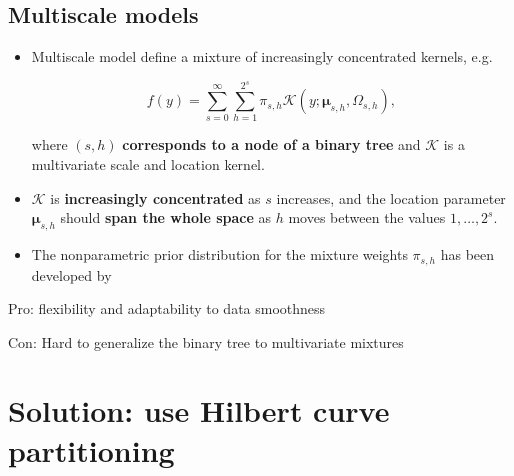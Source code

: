 \documentclass[a0,portrait]{a0poster}
\begin{document}
\begin{multicols}{2}
\subsection*{Multiscale models}
\color{Black}

\begin{itemize}
    \item[] Multiscale model define a mixture of increasingly concentrated kernels, e.g.

        \[
            f(y) = \sum_{s=0}^{\infty }\sum_{h=1}^{2^{s}} \pi_{s,h} \mathcal{K}(y; \bm{\mu}_{s,h}, \Omega_{s,h}),
        \]

        where $(s,h)$ \textbf{corresponds to a node of a binary tree} and $ \mathcal{K}$ is a multivariate scale and location kernel.
        
    \item[] $ \mathcal{K}$ is \textbf{increasingly concentrated} as $ s$ increases, and the location parameter $ \bm{\mu}_{s,h}$ should \textbf{span the whole space} as $ h$ moves between the values $ 1, \ldots, 2^{s}$.

    \item[] The nonparametric prior distribution for the mixture weights $ \pi_{s,h}$ has been developed by \citet{canale2016b}
        
\end{itemize}


\color{Black}
\begin{center}\vspace{1cm}
  
\end{center}\vspace{1cm}

\begin{flushright}
    \color{ForestGreen}
    \smiley{} Pro: flexibility and adaptability to data smoothness

\noindent
\color{red}
\frownie{} Con: Hard to generalize the binary tree to multivariate mixtures
\end{flushright}


\color{DarkRed}
\section*{Solution: use Hilbert curve partitioning}
\color{Black}


\end{multicols}
\end{document}
